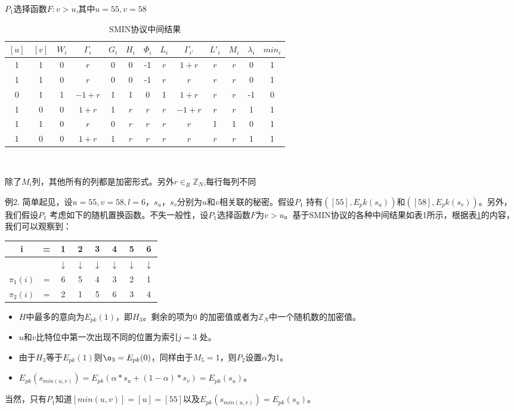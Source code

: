 \begin{table}[htbp]
\centering  %
$P_1$选择函数$F:v>u$,其中$u=55,v=58$
\begin{tabular}{ccccccccccccc}  %
\hline
 $[u]$&$[v]$&$W_i$&$\Gamma_i$&$G_i$&$H_i$&$\Phi_i$&$L_i$&$\Gamma_{i'}$&$L'_i$&$M_i$&$\lambda_i$&$min_i$\\ \hline  %
1 &1 &0 &$r$ &0 &0 &-1 &$r$ &$1+r$ &$r$ &$r$ &0 &1\\        %
1 &1 &0 &$r$ &0 &0 &-1 &$r$ &$r$ &$r$ &$r$ &0 &1\\        %
0 &1 &1 &$-1+r$ &1 &1 &0 &1 &$1+r$ &$r$ &$r$ &-1 &0\\
1 &0 &0 &$1+r$ &1 &$r$ &$r$ &$r$ &$-1+r$ &$r$ &$r$ &1 &1\\
1 &1 &0 &$r$ &0 &$r$ &$r$ &$r$ &$r$ &1 &1 &0 &1\\
1 &0 &0 &$1+r$ &1 &$r$ &$r$ &$r$ &$r$ &$r$ &$r$ &1 &1\\ \hline
\end{tabular}\\
\caption{ SMIN协议中间结果}\label{TABLE1}
除了$M_i$列，其他所有的列都是加密形式。另外$r \in_R \mathbb{Z}_N$,每行每列不同
\end{table}

例2. 简单起见，设$u=55,v=58,l=6$，$s_u$，$s_v$分别为$u$和$v$相关联的秘密。假设$P_1$ 持有$([55],E_pk(s_u))$和$([58],E_pk(s_v))$。另外，我们假设$P_1$ 考虑如下的随机置换函数。不失一般性，设$P_1$选择函数$F$为$v>u$。基于SMIN协议的各种中间结果如表1所示，根据表\ref{TABLE1}的内容，我们可以观察到：
\begin{table}[H]
\centering  %
\begin{tabular}{cccccccc}  %
\hline
i &=&1 &2&3&4&5&6\\ \hline  %
 & & $\downarrow$& $\downarrow$&$\downarrow$ &$\downarrow$ &$\downarrow$ & $\downarrow$\\         %
$\pi_1(i)$ &= &6 &5 &4 &3 &2 &1\\        %
$\pi_2(i)$ &= &2 &1 &5 &6 &3 &4\\ \hline
\end{tabular}
\end{table}
\begin{itemize}

\item $H$中最多的意向为$E_{pk}(1)$，即$H_3$。剩余的项为0 的加密值或者为$\mathbb{Z}_N$中一个随机数的加密值。

\item $u$和$v$比特位中第一次出现不同的位置为索引$j=3$ 处。
\item 由于$H_3$等于$E_{pk}(1)$则${\o}_3=E_{pk}(0)$，同样由于$M_5=1$，则$P_2$设置$\alpha$为1。
\item $E_{pk}(s_{min(u,v)})=E_{pk}(\alpha * s_u + (1-\alpha)*s_v)=E_{pk}(s_u)$。
\end{itemize}
当然，只有$P_1$知道$[min(u,v)]=[u]=[55]$以及$E_{pk}(s_{min(u,v)})=E_{pk}(s_u)$。
